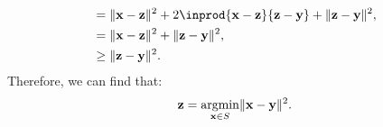 \documentclass{huhtakm-template-book-v2}
\DeclareMathOperator*{\argmin}{argmin}
\begin{document}
\begin{proofing}
\begin{itemize}
\begin{align*}
                &= \norm{\mathbf{x}-\mathbf{z}}^{2} + 2\inprod{\mathbf{x}-\mathbf{z}}{\mathbf{z}-\mathbf{y}} + \norm{\mathbf{z}-\mathbf{y}}^{2},\\
                &= \norm{\mathbf{x}-\mathbf{z}}^{2} + \norm{\mathbf{z}-\mathbf{y}}^{2},\\
                &\geq \norm{\mathbf{z}-\mathbf{y}}^{2}.
            \end{align*}
            Therefore, we can find that:
            \begin{equation*}
                \mathbf{z} = \argmin_{\mathbf{x} \in S}\norm{\mathbf{x}-\mathbf{y}}^{2}.
            \end{equation*}
        \end{itemize}
    \end{proofing}
    \newpage
\end{document}
